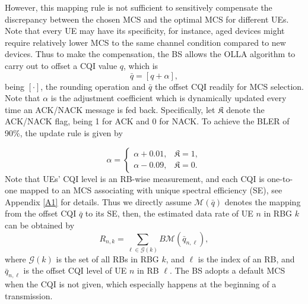 \documentclass[journal]{IEEEtran}
\begin{document}
However, this mapping rule is not sufficient to sensitively compensate the discrepancy between the chosen MCS and the optimal MCS for different UEs. Note that every UE may have its specificity, for instance, aged devices might require relatively lower MCS to the same channel condition compared to new devices. Thus to make the compensation, the BS allows the OLLA algorithm to carry out to offset a CQI value $q$, which is
\begin{equation}
\bar{q}=\left[q+\alpha\right],
\end{equation}
being $[\cdot]$, the rounding operation and $\bar{q}$ the offset CQI readily for MCS selection. Note that $\alpha$ is the adjustment coefficient which is dynamically updated every time an ACK/NACK message is fed back. Specifically, let $\mathfrak{K}$ denote the ACK/NACK flag, being 1 for ACK and 0 for NACK. To achieve the BLER of 90\%, the update rule is given by 

\begin{equation}
\alpha=
\begin{cases}
\alpha+0.01, & \mathfrak{K} = 1, \\
\alpha-0.09, & \mathfrak{K} = 0.
\end{cases}
\end{equation}
Note that UEs' CQI level is an RB-wise measurement, and each CQI is one-to-one mapped to an MCS associating with unique spectral efficiency (SE), see Appendix \ref{A1} for details. Thus we directly assume $\mathcal{M}(\bar{q})$ denotes the mapping from the offset CQI $\bar{q}$ to its SE, then, the estimated data rate of UE $n$ in RBG $k$ can be obtained by
\begin{equation}
R_{n,k}=\sum_{\ell\in \mathcal{G}(k)} B\mathcal{M}(\bar{q}_{n,\ell}),
\end{equation}
where $\mathcal{G}(k)$ is the set of all RBs in RBG $k$, and $\ell$ is the index of an RB, and $\bar{q}_{n,\ell}$ is the offset CQI level of UE $n$ in RB $\ell$. The BS adopts a default MCS when the CQI is not given, which especially happens at the beginning of a transmission. 
\end{document}
